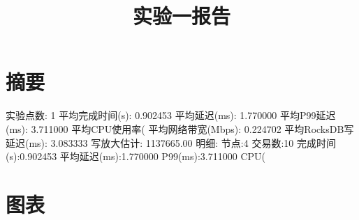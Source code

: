 \documentclass{ctexart}
\title{实验一报告}
\date{}
\begin{document}
\maketitle
\section*{摘要}
实验点数: 1
平均完成时间(s): 0.902453
平均延迟(ms): 1.770000
平均P99延迟(ms): 3.711000
平均CPU使用率(%
平均网络带宽(Mbps): 0.224702
平均RocksDB写延迟(ms): 3.083333
写放大估计: 1137665.00
明细:
节点:4 交易数:10 完成时间(s):0.902453 平均延迟(ms):1.770000 P99(ms):3.711000 CPU(%
\section*{图表}
\end{document}
